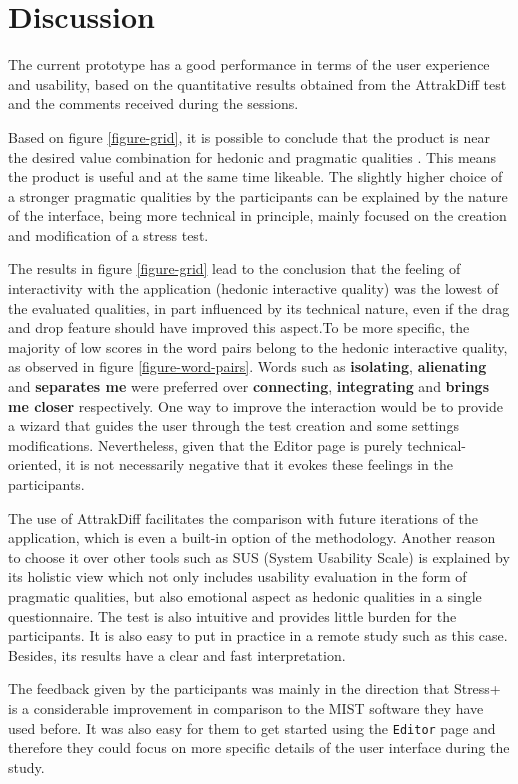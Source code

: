 \documentclass[conference]{IEEEtran}
\begin{document}
\section{Discussion}
\label{sec:discussion}
The current prototype has a good performance in terms of the user experience and
usability, based on the quantitative results obtained from the AttrakDiff test
and the comments received during the sessions.


Based on figure \ref{figure-grid}, it is possible to conclude that the product is
near the desired value combination for hedonic and pragmatic qualities . This
means the product is useful and at the same time likeable. The slightly higher
choice of a stronger pragmatic qualities by the participants can be explained by
the nature of the interface, being more technical in principle, mainly focused
on the creation and modification of a stress test.

The results in figure \ref{figure-grid} lead to the conclusion that the feeling of
interactivity with the application (hedonic interactive quality) was the lowest
of the evaluated qualities, in part influenced by its technical nature, even if
the drag and drop feature should have improved this aspect.To be more specific,
the majority of low scores in the word pairs belong to the hedonic interactive
quality, as observed in figure \ref{figure-word-pairs}. Words such as \textbf{isolating},
\textbf{alienating} and \textbf{separates me} were preferred over \textbf{connecting}, \textbf{integrating}
and \textbf{brings me closer} respectively. One way to improve the interaction would be
to provide a wizard that guides the user through the test creation and some
settings modifications. Nevertheless, given that the Editor page is purely
technical-oriented, it is not necessarily negative that it evokes these feelings
in the participants.

The use of AttrakDiff facilitates the comparison with future iterations of the
application, which is even a built-in option of the methodology. Another reason
to choose it over other tools such as SUS (System Usability Scale) is explained
by its holistic view which not only includes usability evaluation in the form of
pragmatic qualities, but also emotional aspect as hedonic qualities in a single
questionnaire. The test is also intuitive and provides little burden for the
participants. It is also easy to put in practice in a remote study such as this
case. Besides, its results have a clear and fast interpretation.

The feedback given by the participants was mainly in the direction that Stress+
is a considerable improvement in comparison to the MIST software they have used
before. It was also easy for them to get started using the \texttt{Editor} page and
therefore they could focus on more specific details of the user interface during
the study.
\end{document}
